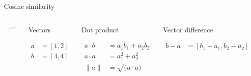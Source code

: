 \documentclass[
  10pt,
  ignorenonframetext,
  x11names, dvipsnames, bibspacing, natbib, table]{beamer}
\begin{document}
\begin{frame}{Cosine similarity}
\protect\hypertarget{cosine-similarity-2}{}
\begin{columns}
    

\begin{center}\includegraphics[width=1\linewidth]{tryOut_files/figure-beamer/cosine3-1} \end{center}




\footnotesize 


\begin{block}{Vectors}

\begin{align*}
a  & = [1,2]\\
b  &= [4,4]
\end{align*}

\end{block}


\begin{block}{Dot product}

\begin{align*}
a \cdot b & = a_1 b_1 + a_2 b_2\\
a \cdot a & = a_1^2 + a_2 ^ 2 \\
\lVert a\rVert & = \sqrt(a \cdot a)
\end{align*}

\end{block}


\begin{block}{Vector difference}

\begin{align*}
b - a & = [b_1- a_1, b_2 - a_2 ]
\end{align*}

\end{block}

\end{columns}
\end{frame}
\end{document}
